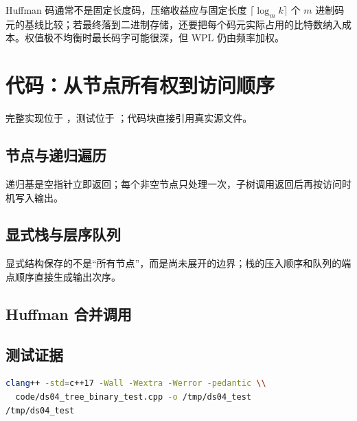 \documentclass[UTF8,fontset=none,11pt,a4paper]{ctexart}
\begin{document}
Huffman 码通常不是固定长度码，压缩收益应与固定长度 $\lceil\log_m k\rceil$ 个 $m$ 进制码元的基线比较；若最终落到二进制存储，还要把每个码元实际占用的比特数纳入成本。权值极不均衡时最长码字可能很深，但 WPL 仍由频率加权。

\section{代码：从节点所有权到访问顺序}
完整实现位于 ，测试位于 ；代码块直接引用真实源文件。
\subsection{节点与递归遍历}

递归基是空指针立即返回；每个非空节点只处理一次，子树调用返回后再按访问时机写入输出。
\subsection{显式栈与层序队列}

显式结构保存的不是“所有节点”，而是尚未展开的边界；栈的压入顺序和队列的端点顺序直接生成输出次序。
\subsection{Huffman 合并调用}

\subsection{测试证据}

\begin{lstlisting}[language=bash]
clang++ -std=c++17 -Wall -Wextra -Werror -pedantic \\
  code/ds04_tree_binary_test.cpp -o /tmp/ds04_test
/tmp/ds04_test
\end{lstlisting}
\end{document}
